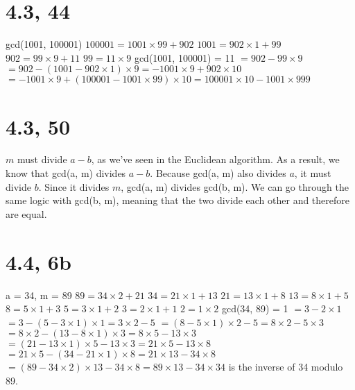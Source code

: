 \documentclass{article}
\begin{document}
\section{4.3, 44}
gcd(1001, 100001)
\newline
$100001 = 1001 \times 99 + 902$
\newline
$1001 = 902 \times 1 + 99$
\newline
$902 = 99 \times 9 + 11$
\newline
$99 = 11 \times 9$
\newline
gcd(1001, 100001) = 11
\newline
$= 902 - 99 \times 9$
\newline
$= 902 - (1001 - 902 \times 1) \times 9 = -1001 \times 9 +902 \times 10$
\newline
$= -1001 \times 9 + (100001 - 1001 \times 99) \times 10 = 100001 \times 10 - 1001 \times 999$

\section{4.3, 50}
$m$ must divide $a - b$, as we've seen in the Euclidean algorithm. As a result, we know that gcd(a, m) divides $a - b$. Because gcd(a, m) also divides $a$, it must divide $b$. Since it divides $m$, gcd(a, m) divides gcd(b, m). We can go through the same logic with gcd(b, m), meaning that the two divide each other and therefore are equal.

\section{4.4, 6b}
a = 34, m = 89
\newline
$89 = 34 \times 2 + 21$
\newline
$34 = 21 \times 1 + 13$
\newline
$21 = 13 \times 1 + 8$
\newline
$13 = 8 \times 1 + 5$
\newline
$8 = 5 \times 1 + 3$
\newline
$5 = 3 \times 1 + 2$
\newline
$3 = 2 \times 1 + 1$
\newline
$2 = 1 \times 2$
\newline
gcd(34, 89) = 1
\newline
$= 3 - 2 \times 1$
\newline
$= 3 - (5 - 3 \times 1) \times 1 = 3 \times 2 - 5$
\newline
$= (8 - 5 \times 1) \times 2 - 5 = 8 \times 2 - 5 \times 3$
\newline
$= 8 \times 2 - (13 - 8 \times 1) \times 3 = 8 \times 5 - 13 \times 3$
\newline
$= (21 - 13 \times 1) \times 5 - 13 \times 3 = 21 \times 5 - 13 \times 8$
\newline
$= 21 \times 5 - (34 - 21 \times 1) \times 8 = 21 \times 13 - 34 \times 8$
\newline
$= (89 - 34 \times 2) \times 13 - 34 \times 8 = 89 \times 13 - 34 \times 34$
 is the inverse of 34 modulo 89.
\end{document}
